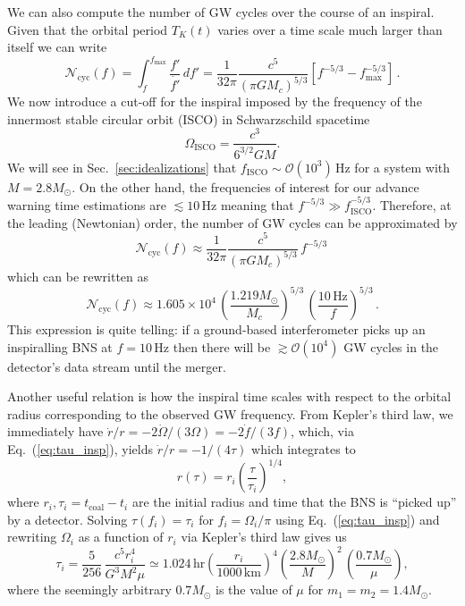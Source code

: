 \documentclass[prd,amsmath,amssymb,aps,floats,amsfonts,notitlepage,superscriptaddress,eqsecnum,nofootinbib,10pt]{revtex4-1}
\newcommand{\ord}{\mathcal{O}}
\newcommand{\f}{\frac}
\newcommand{\be}{\begin{equation}}
\newcommand{\ee}{\end{equation}}
\begin{document}
We can also compute the number of GW cycles over the course of an inspiral. Given that the orbital period $T_K(t)$ varies over a time scale much larger than itself
we can write
%
\be
\mathcal{N}_\text{cyc}(f) = \int_f^{f_\text{max}} \f{f'}{\dot{f'}}\, df' =\f{1}{32\pi} \f{c^5}{(\pi G M_c)^{5/3}}\left[ f^{-5/3}-f_\text{max}^{-5/3}\right] \label{eq:Ncyc1}\, .
\ee
%
We now introduce a cut-off for the inspiral imposed by the frequency of the innermost stable circular orbit (ISCO) in Schwarzschild spacetime
\be
\Omega_\text{ISCO} = \f{c^3}{6^{3/2} G M} \label{eq:Sch_f_isco}.
\ee
%
%
We will see in Sec.~\ref{sec:idealizations} that $f_\text{ISCO} \sim \ord(10^3)\,$Hz for a system with $M =2.8 M_\odot$. 
On the other hand, the frequencies of interest for our advance warning time estimations are $\lesssim 10\,$Hz
meaning that $f^{-5/3} \gg f_\text{ISCO}^{-5/3}$. Therefore, at the leading (Newtonian) order, the number of GW cycles can be approximated by
%
\be
\mathcal{N}_\text{cyc}(f) \approx \f{1}{32\pi} \f{c^5}{(\pi G M_c)^{5/3}}\, f^{-5/3} \,  \label{eq:Ncyc2}
\ee
%
%
which can be rewritten as
\be
\mathcal{N}_\text{cyc}(f)\approx 1.605\times 10^4 \,\left(\f{1.219 M_\odot}{M_c}\right)^{5/3}\, \left(\f{10\,\text{Hz}}{f} \right)^{5/3}\label{eq:Ncyc3}\, .
\ee
%
This expression is quite telling: if a ground-based interferometer picks up an
inspiralling BNS at $f=10\,$Hz then there will be $\gtrsim \ord(10^4)$ GW cycles in the detector's data stream until the merger.

Another useful relation is how the inspiral time scales with respect to the orbital radius corresponding to the observed GW frequency.
From Kepler's third law, we immediately have $\dot{r}/r= -2\dot{\Omega}/(3\Omega)=-2\dot{f}/(3f)$, which, via Eq.~(\ref{eq:tau_insp}),
yields $\dot{r}/r= -1/(4\tau)$ which integrates to
%
\be
r(\tau)=r_i \left(\f{\tau}{\tau_i}\right)^{1/4}\label{eq:r_of_tau},
\ee
%
where $r_i, \tau_i=t_\text{coal}-t_i$ are the initial radius and time that the BNS
is ``picked up'' by a detector. Solving $\tau(f_i)=\tau_i$ for $f_i=\Omega_i/\pi$ using Eq.~(\ref{eq:tau_insp}) and rewriting $\Omega_i$ as a function of $r_i$ via
Kepler's third law gives us
%
\be
\tau_i = \f{5}{256}\, \f{c^5 r_i^4}{G^3 M^2 \mu}\simeq 1.024\,\text{hr} \left(\f{r_i}{1000\,\text{km}}\right)^4 \left(\f{2.8M_\odot}{M}\right)^2\,\left(\f{0.7M_\odot}{\mu}\right)
\label{eq:tau_of_r},
\ee
%
where the seemingly arbitrary $0.7M_\odot$ is the value of $\mu$ for $m_1=m_2=1.4M_\odot$.
\end{document}
